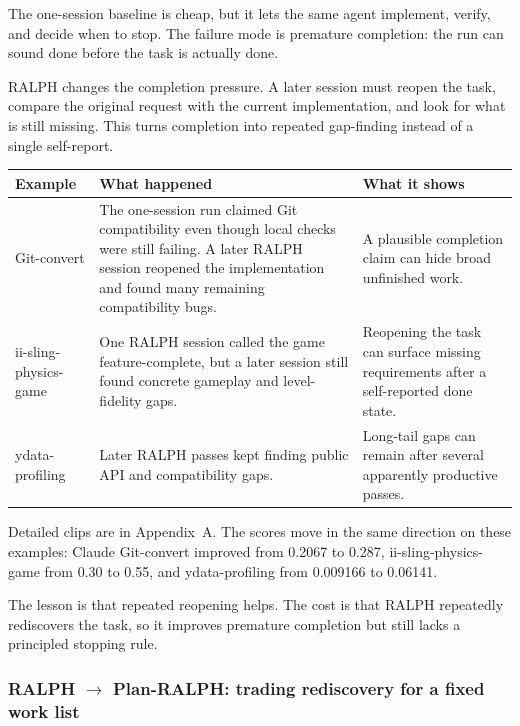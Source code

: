 \documentclass[11pt,a4paper]{article}
\renewcommand{\arraystretch}{1.18}
\newcommand{\code}[1]{#1}
\begin{document}
The one-session baseline is cheap, but it lets the same agent implement, verify, and decide when to stop. The failure mode is premature completion: the run can sound done before the task is actually done.

RALPH changes the completion pressure. A later session must reopen the task, compare the original request with the current implementation, and look for what is still missing. This turns completion into repeated gap-finding instead of a single self-report.

\begingroup
\renewcommand{\arraystretch}{1.25}
\setlength{\tabcolsep}{6pt}
\footnotesize
\noindent\begin{tabular}{@{}p{2.6cm}p{6.5cm}p{5.5cm}@{}}
\toprule
\rowcolor{tablehead}\textbf{\color{white}Example} & \textbf{\color{white}What happened} & \textbf{\color{white}What it shows} \\
\midrule
\code{Git-convert} & The one-session run claimed Git compatibility even though local checks were still failing. A later RALPH session reopened the implementation and found many remaining compatibility bugs. & A plausible completion claim can hide broad unfinished work. \\
\rowcolor{tableband}
\code{ii-sling-physics-game} & One RALPH session called the game feature-complete, but a later session still found concrete gameplay and level-fidelity gaps. & Reopening the task can surface missing requirements after a self-reported done state. \\
\code{ydata-profiling} & Later RALPH passes kept finding public API and compatibility gaps. & Long-tail gaps can remain after several apparently productive passes. \\
\bottomrule
\end{tabular}
\endgroup

\vspace{6pt}

Detailed clips are in Appendix~A. The scores move in the same direction on these examples: Claude \code{Git-convert} improved from \code{0.2067} to \code{0.287}, \code{ii-sling-physics-game} from \code{0.30} to \code{0.55}, and \code{ydata-profiling} from \code{0.009166} to \code{0.06141}.

The lesson is that repeated reopening helps. The cost is that RALPH repeatedly rediscovers the task, so it improves premature completion but still lacks a principled stopping rule.

\subsubsection{RALPH $\rightarrow$ Plan-RALPH: trading rediscovery for a fixed work list}
\end{document}
